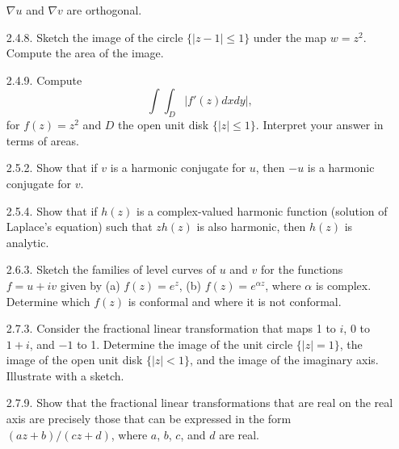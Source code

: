 \documentclass[9pt]{article}
\begin{document}
\begin{enumerate}
                  $\nabla u$ and $\nabla v$ are orthogonal.
   \item[2.4.8.]  Sketch the image of the circle $\{|z-1| \le 1\}$ under the map
                  $w = z^2$. Compute the area of the image.
   \item[2.4.9.]  Compute
                  $$\int\int_D|f'(z)dx dy|,$$
                  for $f(z) = z^2$ and $D$ the open unit disk $\{|z| \le 1\}$.
                  Interpret your answer in terms of areas.
   \item[2.5.2.]  Show that if $v$ is a harmonic conjugate for $u$, then $-u$ is
                  a harmonic conjugate for $v$.
   \item[2.5.4.]  Show that if $h(z)$ is a complex-valued harmonic function 
                  (solution of Laplace's equation) such that $zh(z)$ is also
                  harmonic, then $h(z)$ is analytic.
   \item[2.6.3.]  Sketch the families of level curves of $u$ and $v$ for the
                  functions $f = u + iv$ given by (a) $f(z) = e^z$, (b)
                  $f(z) = e^{\alpha z}$, where $\alpha$ is complex. Determine
                  which $f(z)$ is conformal and where it is not conformal.
   \item[2.7.3.]  Consider the fractional linear transformation that maps 1 to
                  $i$, 0 to $1 + i$, and $-1$ to 1. Determine the image of the
                  unit circle $\{|z| = 1\}$, the image of the open unit disk
                  $\{|z| < 1\}$, and the image of the imaginary axis. Illustrate
                  with a sketch.
   \item[2.7.9.]  Show that the fractional linear transformations that are real
                  on the real axis are precisely those that can be expressed in
                  the form $(az+b)/(cz+d)$, where $a$, $b$, $c$, and $d$ are
                  real.
\end{enumerate}
\end{document}
